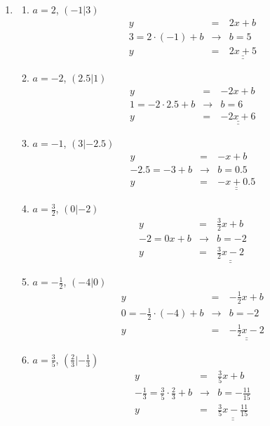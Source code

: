 \documentclass[%
11pt,%
twoside,%
titlepage,%
german,%
headsepline%
]{scrartcl}
\newcommand{\result}[1]{\underline{\underline{#1}}}
\begin{document}
{{{\begin{enumerate}
\item 
  \begin{enumerate}
  \item $a=2$, $(-1|3)$
    \begin{eqnarray*}
      y & = & 2x + b \\
      3 = 2\cdot (-1) + b & \rightarrow & b = 5 \\
      y & = & \result{2x + 5}
    \end{eqnarray*}
  \item $a=-2$, $(2.5|1)$
    \begin{eqnarray*}
      y & = & -2x + b \\
      1 = -2 \cdot 2.5 + b & \rightarrow & b = 6 \\
      y & = & \result{-2x + 6}
    \end{eqnarray*}
  \item $a=-1$, $(3|-2.5)$
    \begin{eqnarray*}
      y & = & -x + b \\
      -2.5 = -3 + b & \rightarrow & b = 0.5 \\
      y & = & \result{-x + 0.5}
    \end{eqnarray*}
  \item $a=\frac{3}{2}$, $(0|-2)$
    \begin{eqnarray*}
      y & = & \frac{3}{2}x + b \\
      -2 = 0x + b & \rightarrow & b = -2 \\
      y & = & \result{\frac{3}{2}x - 2}
    \end{eqnarray*}
  \item $a=-\frac{1}{2}$, $(-4|0)$
    \begin{eqnarray*}
      y & = & -\frac{1}{2}x + b \\
      0 = -\frac{1}{2} \cdot (-4) + b & \rightarrow & b = -2 \\
      y & = & \result{-\frac{1}{2}x - 2}
    \end{eqnarray*}
  \item $a=\frac{3}{5}$, $(\frac{2}{3}|-\frac{1}{3})$
    \begin{eqnarray*}
      y & = & \frac{3}{5}x + b \\
      -\frac{1}{3} = \frac{3}{5} \cdot \frac{2}{3} + b & \rightarrow & b = -\frac{11}{15} \\
      y & = & \result{\frac{3}{5}x-\frac{11}{15}}
    \end{eqnarray*}
  \end{enumerate}
  

\end{enumerate}}}}
\end{document}
